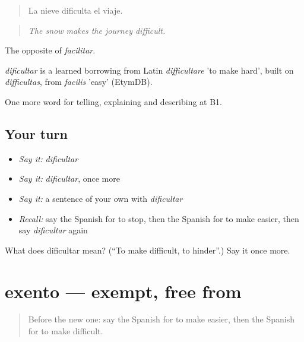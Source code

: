 \begin{quote}
La nieve dificulta el viaje.
\end{quote}

\begin{quote}
\emph{The snow makes the journey difficult.}
\end{quote}

The opposite of \emph{facilitar}.

\begin{cousinweb}
\emph{dificultar} is a learned borrowing from Latin \emph{difficultare} 'to make hard', built on \emph{difficultas}, from \emph{facilis} 'easy' (EtymDB).
\end{cousinweb}

\begin{grammarlens}[title={What you've built}]
One more word for telling, explaining and describing at B1.
\end{grammarlens}

\subsection*{Your turn}
\begin{itemize}
\raggedright
  \item \emph{Say it:} \emph{dificultar}
  \item \emph{Say it:} \emph{dificultar}, once more
  \item \emph{Say it:} a sentence of your own with \emph{dificultar}
  \item \emph{Recall:} say the Spanish for to stop, then the Spanish for to make easier, then say \emph{dificultar} again
\end{itemize}

\begin{tcolorbox}[breakable,colback=teal!4,colframe=teal!35!black,title={Before you move on}]
What does dificultar mean? (\textquotedblleft{}To make difficult, to hinder\textquotedblright{}.) Say it once more.
\end{tcolorbox}
\section[exento]{exento — exempt, free from}

\label{lesson:ES-C621-exento}



\begin{quote}
Before the new one: say the Spanish for to make easier, then the Spanish for to make difficult.
\end{quote}

